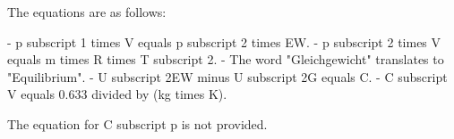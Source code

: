 The equations are as follows:

- p subscript 1 times V equals p subscript 2 times EW.
- p subscript 2 times V equals m times R times T subscript 2.
- The word "Gleichgewicht" translates to "Equilibrium".
- U subscript 2EW minus U subscript 2G equals C.
- C subscript V equals 0.633 divided by (kg times K).

The equation for C subscript p is not provided.